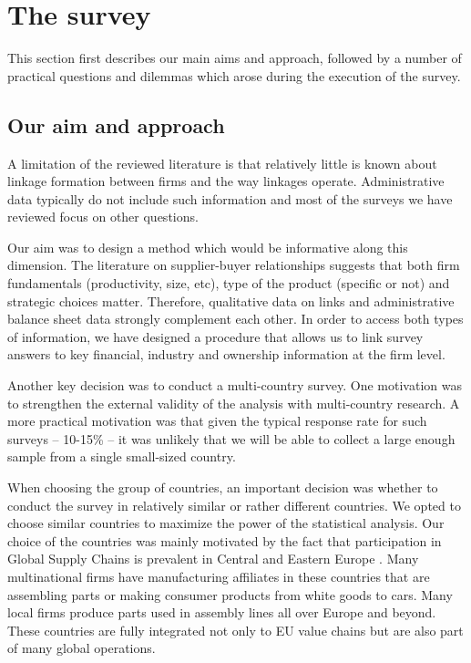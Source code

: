 \documentclass[final, dvipsnames, authoryear,12pt]{elsarticle}
\begin{document}
\section{The survey}
\label{sec:survey}

This section first describes our main aims and approach, followed by a number of practical questions and dilemmas which arose during the execution of the survey.

  
\subsection{Our aim and approach}

A limitation of the reviewed literature is that relatively little is known about linkage formation between firms and the way linkages operate. Administrative data typically do not include such information and most of the surveys we have reviewed focus on other questions.

Our aim was to design a method which would be informative along this dimension. The literature on supplier-buyer relationships suggests that both firm fundamentals (productivity, size, etc), type of the product (specific or not) and strategic choices matter. Therefore, qualitative data on links and administrative balance sheet data strongly complement each other. In order to access both types of information, we have designed a procedure that allows us to link survey answers to key financial, industry and ownership information at the firm level.

Another key decision was to conduct a multi-country survey. One motivation was to strengthen the external validity of the analysis with multi-country research. A more practical motivation was that given the typical response rate for such surveys -- 10-15\% -- it was unlikely that we will be able to collect a large enough sample from a single small-sized country. 

When choosing the group of countries, an important decision was whether to conduct the survey in relatively similar or rather different countries. We opted to choose similar countries to maximize the power of the statistical analysis. Our choice of the countries was mainly motivated by the fact that participation in Global Supply Chains is prevalent in Central and Eastern Europe \citep{oecd2017gvc}. Many multinational firms have manufacturing affiliates in these countries that are assembling parts or making consumer products from white goods to cars. Many local firms produce parts used in assembly lines all over Europe and beyond. These countries are fully integrated not only to EU value chains but are also part of many global operations.  
\end{document}
